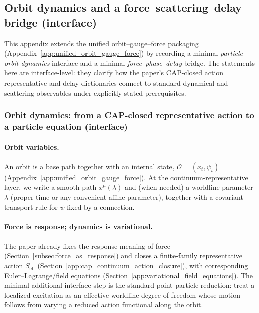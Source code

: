 \subsection{Orbit dynamics and a force--scattering--delay bridge (interface)}
\label{app:orbit_dynamics_and_force_scattering_bridge}

This appendix extends the unified orbit--gauge--force packaging (Appendix~\ref{app:unified_orbit_gauge_force}) by recording a minimal \emph{particle-orbit dynamics} interface and a minimal \emph{force--phase--delay} bridge.
The statements here are interface-level: they clarify how the paper's CAP-closed action representative and delay dictionaries connect to standard dynamical and scattering observables under explicitly stated prerequisites.

\subsubsection{Orbit dynamics: from a CAP-closed representative action to a particle equation (interface)}
\paragraph{Orbit variables.}
\InterfaceTag An orbit is a base path together with an internal state, $\mathcal{O}=(x_t,\psi_t)$ (Appendix~\ref{app:unified_orbit_gauge_force}).
At the continuum-representative layer, we write a smooth path $x^\mu(\lambda)$ and (when needed) a worldline parameter $\lambda$ (proper time or any convenient affine parameter), together with a covariant transport rule for $\psi$ fixed by a connection.

\paragraph{Force is response; dynamics is variational.}
\InterfaceTag The paper already fixes the response meaning of force (Section~\ref{subsec:force_as_response}) and closes a finite-family representative action $S_{\mathrm{eff}}$ (Section~\ref{app:cap_continuum_action_closure}), with corresponding Euler--Lagrange/field equations (Section~\ref{app:variational_field_equations}).
The minimal additional interface step is the standard point-particle reduction: treat a localized excitation as an effective worldline degree of freedom whose motion follows from varying a reduced action functional along the orbit.

